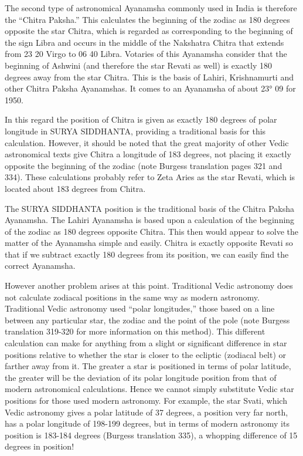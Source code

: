  

The second type of astronomical Ayanamsha commonly used in India is therefore the “Chitra Paksha.” This calculates the beginning of the zodiac as 180 degrees opposite the star Chitra, which is regarded as corresponding to the beginning of the sign Libra and occurs in the middle of the Nakshatra Chitra that extends from 23 20 Virgo to 06 40 Libra. Votaries of this Ayanamsha consider that the beginning of Ashwini (and therefore the star Revati as well) is exactly 180 degrees away from the star Chitra. This is the basis of Lahiri, Krishnamurti and other Chitra Paksha Ayanamshas. It comes to an Ayanamsha of about 23° 09 for 1950.

 

In this regard the position of Chitra is given as exactly 180 degrees of polar longitude in SURYA SIDDHANTA, providing a traditional basis for this calculation. However, it should be noted that the great majority of other Vedic astronomical texts give Chitra a longitude of 183 degrees, not placing it exactly opposite the beginning of the zodiac (note Burgess translation pages 321 and 334). These calculations probably refer to Zeta Aries as the star Revati, which is located about 183 degrees from Chitra.

 

The SURYA SIDDHANTA position is the traditional basis of the Chitra Paksha Ayanamsha. The Lahiri Ayanamsha is based upon a calculation of the beginning of the zodiac as 180 degrees opposite Chitra. This then would appear to solve the matter of the Ayanamsha simple and easily. Chitra is exactly opposite Revati so that if we subtract exactly 180 degrees from its position, we can easily find the correct Ayanamsha.

 

However another problem arises at this point. Traditional Vedic astronomy does not calculate zodiacal positions in the same way as modern astronomy. Traditional Vedic astronomy used “polar longitudes,” those based on a line between any particular star, the zodiac and the point of the pole (note Burgess translation 319-320 for more information on this method). This different calculation can make for anything from a slight or significant difference in star positions relative to whether the star is closer to the ecliptic (zodiacal belt) or farther away from it. The greater a star is positioned in terms of polar latitude, the greater will be the deviation of its polar longitude position from that of modern astronomical calculations. Hence we cannot simply substitute Vedic star positions for those used modern astronomy. For example, the star Svati, which Vedic astronomy gives a polar latitude of 37 degrees, a position very far north, has a polar longitude of 198-199 degrees, but in terms of modern astronomy its position is 183-184 degrees (Burgess translation 335), a whopping difference of 15 degrees in position!

